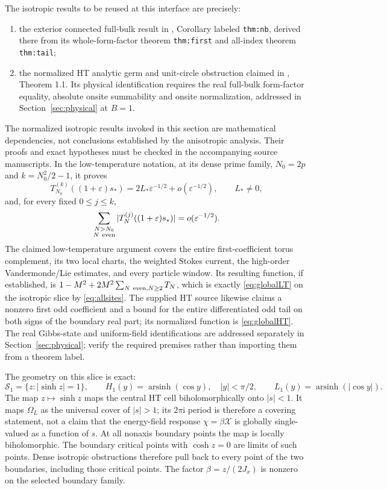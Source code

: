 \documentclass[11pt]{article}
\numberwithin{equation}{section}
\theoremstyle{definition}
\newcommand{\ii}{\mathrm i}
\newcommand{\eps}{\varepsilon}
\newcommand{\cS}{\mathcal S}
\newcommand{\OL}{\Omega_L}
\begin{document}
The isotropic results to be reused at this interface are precisely:
\begin{enumerate}
\item the exterior connected full-bulk result in
\cite{LTsource}, Corollary labeled \texttt{thm:nb}, derived there from
its whole-form-factor theorem \texttt{thm:first} and all-index theorem
\texttt{thm:tail};
\item the normalized HT analytic germ and unit-circle obstruction claimed
in \cite{HTsource}, Theorem 1.1. Its physical identification requires the
real full-bulk form-factor equality, absolute onsite summability and
onsite normalization, addressed in Section~\ref{sec:physical} at $B=1$.
\end{enumerate}
The normalized isotropic results invoked in this section are mathematical
dependencies, not conclusions established by the anisotropic analysis.
Their proofs and exact hypotheses must be checked in the accompanying
source manuscripts. In the low-temperature notation, at its dense prime family,
$N_0=2p$ and $k=N_0^2/2-1$, it proves
\[
 T_{N_0}^{(k)}((1+\eps)s_*)
 =2L_*\eps^{-1/2}+o(\eps^{-1/2}),\qquad L_*\ne0,
\]
and, for every fixed $0\le j\le k$,
\[
 \sum_{\substack{N>N_0\\N\ {\rm even}}}
 |T_N^{(j)}((1+\eps)s_*)|=o(\eps^{-1/2}).
\]
The claimed low-temperature argument covers the entire first-coefficient torus
complement, its two local charts, the weighted Stokes current, the
high-order Vandermonde/Lie estimates, and every particle window.
Its resulting function, if established, is
$1-M^2+2M^2\sum_{N\ {\rm even},N\ge2}T_N$, which is exactly
\eqref{eq:globalLT} on the isotropic slice by \eqref{eq:allsites}.
The supplied HT source likewise claims a nonzero first odd coefficient
and a bound for the entire differentiated odd tail on both signs of the
boundary real part; its normalized function is \eqref{eq:globalHT}.
The real Gibbs-state and uniform-field identifications are addressed
separately in Section~\ref{sec:physical}; verify the required premises
rather than importing them from a theorem label.

The geometry on this slice is exact:
\[
 \cS_1=\{z:|\sinh z|=1\},\qquad
 H_1(y)=\operatorname{arsinh}(\cos y),\quad |y|<\pi/2,
 \qquad L_1(y)=\operatorname{arsinh}(|\cos y|).
\]
The map $z\mapsto\sinh z$ maps the central HT cell biholomorphically
onto $|s|<1$. It maps $\OL$ as the universal cover of $|s|>1$;
its $2\pi\ii$ period is therefore a covering statement, not a claim
that the energy-field response $\chi=\beta\mathcal X$ is globally
single-valued as a function of $s$. At all nonaxis boundary points the
map is locally biholomorphic. The boundary critical points with
$\cosh z=0$ are limits of such points. Dense isotropic obstructions
therefore pull back to every point of the two boundaries, including
those critical points. The factor $\beta=z/(2J_x)$ is nonzero on the
selected boundary family.
\end{document}
